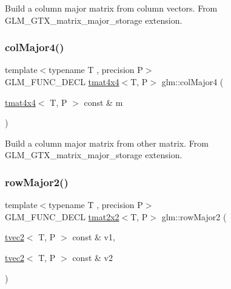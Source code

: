 Build a column major matrix from column vectors. From G\+L\+M\+\_\+\+G\+T\+X\+\_\+matrix\+\_\+major\+\_\+storage extension. \mbox{\label{group__gtx__matrix__major__storage_ga7592acfd27da055e2d7c39564cf8803d}} 
\subsubsection{\texorpdfstring{col\+Major4()}{colMajor4()}\hspace{0.1cm}{\footnotesize\ttfamily [2/2]}}
{\footnotesize\ttfamily template$<$typename T , precision P$>$ \\
G\+L\+M\+\_\+\+F\+U\+N\+C\+\_\+\+D\+E\+CL \hyperlink{structglm_1_1tmat4x4}{tmat4x4}$<$T, P$>$ glm\+::col\+Major4 (\begin{DoxyParamCaption}\item[{\hyperlink{structglm_1_1tmat4x4}{tmat4x4}$<$ T, P $>$ const \&}]{m }\end{DoxyParamCaption})}

Build a column major matrix from other matrix. From G\+L\+M\+\_\+\+G\+T\+X\+\_\+matrix\+\_\+major\+\_\+storage extension. \mbox{\label{group__gtx__matrix__major__storage_ga0c7f4d56a85865f0002127119ab7d551}} 
\subsubsection{\texorpdfstring{row\+Major2()}{rowMajor2()}\hspace{0.1cm}{\footnotesize\ttfamily [1/2]}}
{\footnotesize\ttfamily template$<$typename T , precision P$>$ \\
G\+L\+M\+\_\+\+F\+U\+N\+C\+\_\+\+D\+E\+CL \hyperlink{structglm_1_1tmat2x2}{tmat2x2}$<$T, P$>$ glm\+::row\+Major2 (\begin{DoxyParamCaption}\item[{\hyperlink{structglm_1_1tvec2}{tvec2}$<$ T, P $>$ const \&}]{v1,  }\item[{\hyperlink{structglm_1_1tvec2}{tvec2}$<$ T, P $>$ const \&}]{v2 }\end{DoxyParamCaption})}

